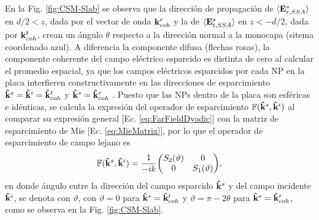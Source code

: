 En la Fig. \ref{fig:CSM-Slab} se observa que la dirección de propagación de  $\langle \vb{E}^s_{r,SSA}\rangle$ en $d/2<z$, dada por el vector de onda $\vb{k}^r_{coh}$ y la de $\langle \vb{E}^s_{t,SSA}\rangle$ en  $z<-d/2$, dada por $\vb{k}^t_{coh}$, crean un ángulo $\theta$ respecto a la dirección normal a la monocapa (sitema coordenado azul). A diferencia la componente difusa (flechas rosas), la componente coherente del campo eléctrico esparcido es distinta de cero al calcular el promedio espacial, ya que los campos eléctricos esparcidos por cada NP en la placa interfieren constructivamente en las direcciones de esparcimiento $\vu{k}^s =\vu{k}^i=\vu{k}^t_{coh}$ y $\vu{k}^s =\vu{k}^r_{coh}$ \cite{garcia2012multiple}. Puesto que las NPs dentro de la placa son esféricas e idénticas, se calcula la expresión del operador de esparcimiento $\mathbb{F}(\vu{k}^s,\vu{k}^i)$ al comparar su expresión general [Ec. \eqref{eq:FarFieldDyadic}] con la matriz de esparcimiento de Mie [Ec. \eqref{eq:MieMatrix}], por lo que el operador de esparcimiento de campo lejano es
	\begin{align}
	\mathbb{F}(\vu{k}^s,\vu{k}^i) = \frac{1}{-ik} 
	 \mqty(S_2(\vartheta) & 0 \\ 0 & S_1(\vartheta)),
	 \label{eq:FFDydadic-Mie}
	\end{align}
en donde ángulo entre la dirección del campo esparcido $\vu{k}^s$ y del campo incidente $\vu{k}^i$, se denota con $\vartheta$, con $\vartheta = 0$ para $\vu{k}^s = \vu{k}^t_{coh}$ y $\vartheta = \pi-2\theta$  para $\vu{k}^s = \vu{k}^r_{coh}$, como se observa en la Fig. \ref{fig:CSM-Slab}.
	

